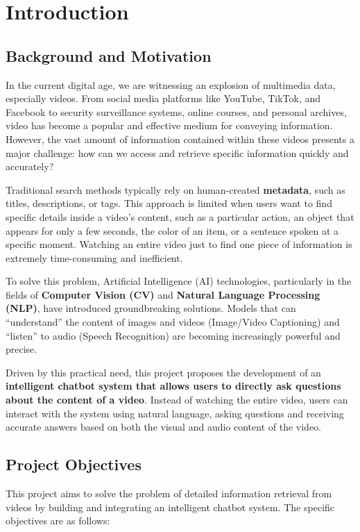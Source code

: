 \section{Introduction}

\subsection{Background and Motivation}

In the current digital age, we are witnessing an explosion of multimedia data, especially videos. From social media platforms like YouTube, TikTok, and Facebook to security surveillance systems, online courses, and personal archives, video has become a popular and effective medium for conveying information. However, the vast amount of information contained within these videos presents a major challenge: how can we access and retrieve specific information quickly and accurately?

Traditional search methods typically rely on human-created \textbf{metadata}, such as titles, descriptions, or tags. This approach is limited when users want to find specific details inside a video's content, such as a particular action, an object that appears for only a few seconds, the color of an item, or a sentence spoken at a specific moment. Watching an entire video just to find one piece of information is extremely time-consuming and inefficient.

To solve this problem, Artificial Intelligence (AI) technologies, particularly in the fields of \textbf{Computer Vision (CV)} and \textbf{Natural Language Processing (NLP)}, have introduced groundbreaking solutions. Models that can ``understand'' the content of images and videos (Image/Video Captioning) and ``listen'' to audio (Speech Recognition) are becoming increasingly powerful and precise.

Driven by this practical need, this project proposes the development of an \textbf{intelligent chatbot system that allows users to directly ask questions about the content of a video}. Instead of watching the entire video, users can interact with the system using natural language, asking questions and receiving accurate answers based on both the visual and audio content of the video.

\subsection{Project Objectives}

This project aims to solve the problem of detailed information retrieval from videos by building and integrating an intelligent chatbot system. The specific objectives are as follows:

